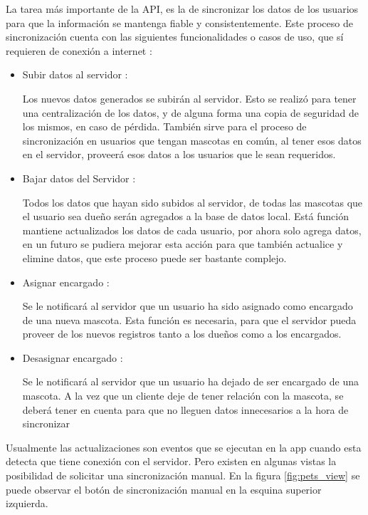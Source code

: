 La tarea más importante de la API, es la de sincronizar los datos de los usuarios para que la información se mantenga fiable y consistentemente. Este proceso de sincronización cuenta con las siguientes funcionalidades o casos de uso, que sí requieren de conexión a internet :
\begin{itemize}
	\item Subir datos al servidor :
	
	Los nuevos datos generados se subirán al servidor. Esto se realizó para tener una centralización de los datos, y de alguna forma una copia de seguridad de los mismos, en caso de pérdida. También sirve para el proceso de sincronización en usuarios que tengan mascotas en común, al tener esos datos en el servidor, proveerá esos datos a los usuarios que le sean requeridos.
	
	\item Bajar datos del Servidor :
	
	Todos los datos que hayan sido subidos al servidor, de todas las mascotas que el usuario sea dueño serán agregados a la base de datos local. Está función mantiene actualizados los datos de cada usuario, por ahora solo agrega datos, en un futuro se pudiera mejorar esta acción para que también actualice y elimine datos, que este proceso puede ser bastante complejo. 
	
	\item Asignar encargado :
	
	Se le notificará al servidor que un usuario ha sido asignado como encargado de una nueva mascota. Esta función es necesaria, para que el servidor pueda proveer de los nuevos registros tanto a los dueños como a los encargados.
	
		\item Desasignar encargado :
	
	Se le notificará al servidor que un usuario ha dejado de ser  encargado de una mascota. A la vez que un cliente deje de tener relación con la mascota, se deberá tener en cuenta para que no lleguen datos innecesarios a la hora de sincronizar   
\end{itemize}
Usualmente las actualizaciones son eventos que se ejecutan en la app cuando esta detecta que tiene conexión con el servidor. Pero existen en algunas vistas la posibilidad de solicitar una sincronización manual. En la figura \ref{fig:pets_view} se puede observar el botón de sincronización manual en la esquina superior izquierda.
